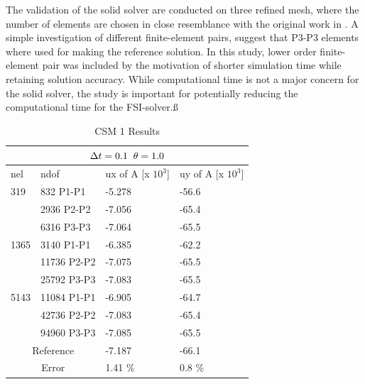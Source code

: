 The validation of the solid solver are conducted on three refined mesh, where the number of elements are chosen in close resemblance with the original work in \cite{Hron2006}. A simple investigation of different finite-element pairs, suggest that P3-P3 elements where used for making the reference solution. In this study, lower order finite-element pair was included by the motivation of shorter simulation time while retaining solution accuracy. While computational time is not a major concern for the solid solver, the study is important for potentially reducing the computational time for the FSI-solver.ß

\begin{table}[h!]
\centering
\caption{CSM 1 Results}
\label{CSM 1 Results}
\begin{tabular}{ |p{1cm}||p{2.7cm}|p{3.3cm}|p{3.3cm}|}
\hline
  \multicolumn{4}{|c|}{$\Delta t = 0.1 \hspace{2mm} \theta = 1.0$} \\
\hline
nel & ndof & ux of A [x $10^{3}$]  &uy of A [x $10^{3}$] \\
\hline
 319     & 832 P1-P1  & -5.278 &  -56.6 \\
     & 2936 P2-P2 & -7.056 &  -65.4 \\
      & 6316 P3-P3 &  -7.064 &   -65.5  \\
 \hline
  1365    & 3140 P1-P1  & -6.385 &  -62.2 \\
     & 11736 P2-P2 & -7.075 &  -65.5 \\
     & 25792 P3-P3 & -7.083 &  -65.5 \\
 \hline
  5143    & 11084 P1-P1 & -6.905 &  -64.7  \\
     & 42736 P2-P2 & -7.083 &  -65.4\\
     & 94960 P3-P3 & -7.085 &  -65.5  \\
  \hline
  \multicolumn{2}{|c|}{Reference}  &-7.187    & -66.1 \\
   \hline
    \multicolumn{2}{|c|}{Error}  & 1.41 \%   & 0.8 \%\\
   \hline
\end{tabular}
\end{table}

